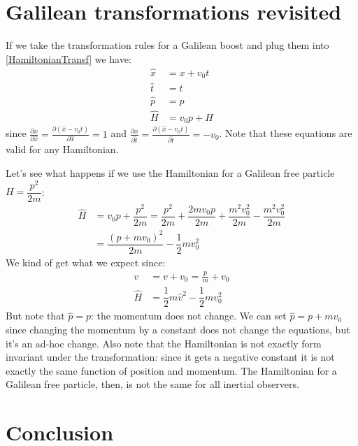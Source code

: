 \documentclass[aps,pra,10pt,floatfix,nofootinbib]{revtex4-1}
\theoremstyle{definition}
\begin{document}
\section{Galilean transformations revisited}
If we take the transformation rules for a Galilean boost and plug them into \eqref{HamiltonianTransf} we have:
\begin{equation}
\begin{aligned}
\hat{x} &= x + v_0 t \\
\hat{t} &= t \\
\hat{p} &= p \\
\hat{H} &= v_0 p + H
\end{aligned}
\label{galTransf}
\end{equation}
since $\frac{\partial x}{\partial \hat{x}} = \frac{\partial (\hat{x} - v_0 t)}{\partial \hat{x}} = 1$ and $\frac{\partial x}{\partial \hat{t}} = \frac{\partial (\hat{x} - v_0 t)}{\partial \hat{t}} = - v_0$. Note that these equations are valid for any Hamiltonian.

Let's see what happens if we use the Hamiltonian for a Galilean free particle $H=\dfrac{p^2}{2m}$:
\begin{equation}
\begin{aligned}
\hat{H} &= v_0 p + \dfrac{p^2}{2m} = \dfrac{p^2}{2m} + \dfrac{2mv_0 p}{2m} + \dfrac{m^2 v_0^2}{2m} - \dfrac{m^2 v_0^2}{2m} \\
&= \dfrac{(p+mv_0)^2}{2m} - \dfrac{1}{2} m v_0^2
\end{aligned}
\end{equation}
We kind of get what we expect since:
\begin{equation}
\begin{aligned}
\hat{v} &= v + v_0 =  \frac{p}{m} + v_0 \\
\hat{H} &= \dfrac{1}{2} m \hat{v}^2 - \dfrac{1}{2} m v_0^2
\end{aligned}
\end{equation}
But note that $\hat{p} = p$: the momentum does not change. We can set $\hat{p} = p + m v_0$ since changing the momentum by a constant does not change the equations, but it's an ad-hoc change. Also note that the Hamiltonian is not exactly form invariant under the transformation: since it gets a negative constant it is not exactly the same function of position and momentum. The Hamiltonian for a Galilean free particle, then, is not the same for all inertial observers.

\section{Conclusion}
\end{document}
